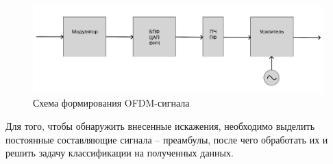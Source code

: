             \begin{figure}[h!]
                \centering
                \includegraphics[scale=0.45]{pictures/index.png}
                \caption{Схема формирования OFDM-сигнала}
                \label{fig:my_label}
            \end{figure} 
            
        \par
            Для того, чтобы обнаружить внесенные искажения, необходимо выделить постоянные составляющие сигнала – преамбулы, после чего обработать их и решить задачу классификации на полученных данных.\\
            
